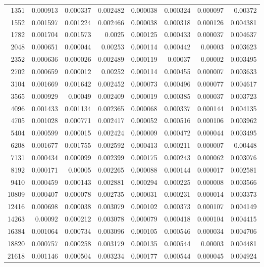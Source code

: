 \begin{longtable}{r r r r r r r r}
1351 & 0.000913 & 0.000337 & 0.002482 & 0.000038 & 0.000324 & 0.000097 & 0.00372 \\
1552 & 0.001597 & 0.001224 & 0.002466 & 0.000038 & 0.000318 & 0.000126 & 0.004381 \\
1782 & 0.001704 & 0.001573 & 0.0025 & 0.000125 & 0.000433 & 0.000037 & 0.004637 \\
2048 & 0.000651 & 0.000044 & 0.00253 & 0.000114 & 0.000442 & 0.00003 & 0.003623 \\
2352 & 0.000636 & 0.000026 & 0.002489 & 0.000119 & 0.00037 & 0.00002 & 0.003495 \\
2702 & 0.000659 & 0.000012 & 0.00252 & 0.000114 & 0.000455 & 0.000007 & 0.003633 \\
3104 & 0.001669 & 0.001642 & 0.002452 & 0.000073 & 0.000496 & 0.000077 & 0.004617 \\
3565 & 0.000929 & 0.00049 & 0.002409 & 0.000019 & 0.000385 & 0.000037 & 0.003723 \\
4096 & 0.001433 & 0.001134 & 0.002365 & 0.000068 & 0.000337 & 0.000144 & 0.004135 \\
4705 & 0.001028 & 0.000771 & 0.002417 & 0.000052 & 0.000516 & 0.000106 & 0.003962 \\
5404 & 0.000599 & 0.000015 & 0.002424 & 0.000009 & 0.000472 & 0.000044 & 0.003495 \\
6208 & 0.001677 & 0.001755 & 0.002592 & 0.000413 & 0.000211 & 0.000007 & 0.00448 \\
7131 & 0.000434 & 0.000099 & 0.002399 & 0.000175 & 0.000243 & 0.000062 & 0.003076 \\
8192 & 0.000171 & 0.00005 & 0.002265 & 0.000088 & 0.000144 & 0.000017 & 0.002581 \\
9410 & 0.000459 & 0.000143 & 0.002881 & 0.000294 & 0.000225 & 0.000008 & 0.003566 \\
10809 & 0.000407 & 0.000078 & 0.002735 & 0.000031 & 0.000231 & 0.000014 & 0.003373 \\
12416 & 0.000698 & 0.000038 & 0.003079 & 0.000102 & 0.000373 & 0.000107 & 0.004149 \\
14263 & 0.00092 & 0.000212 & 0.003078 & 0.000079 & 0.000418 & 0.000104 & 0.004415 \\
16384 & 0.001064 & 0.000734 & 0.003096 & 0.000105 & 0.000546 & 0.000034 & 0.004706 \\
18820 & 0.000757 & 0.000258 & 0.003179 & 0.000135 & 0.000544 & 0.00003 & 0.004481 \\
21618 & 0.001146 & 0.000504 & 0.003234 & 0.000177 & 0.000544 & 0.000045 & 0.004924 \\

\end{longtable}
